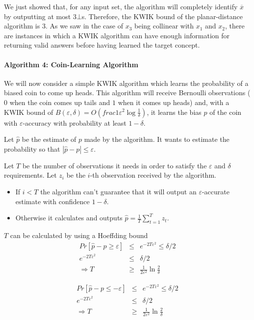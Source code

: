 We just showed that, for any input set, the algorithm will completely identify
$\overline{x}$ by outputting at most $3 \bot$s. Therefore, the KWIK bound of the
planar-distance algorithm is $3$. As we saw in the case of $x_3$ being collinear
with $x_1$ and $x_2$, there are instances in which a KWIK algorithm can
have enough information for returning valid answers before having learned the
target concept.

\paragraph{Algorithm 4: Coin-Learning Algorithm}
We will now consider a simple KWIK algorithm which learns the probability of a
biased coin to come up heads. This algorithm will receive Bernoulli observations
($0$ when the coin comes up tails and $1$ when it comes up heads) and, with a
KWIK bound of $B(\varepsilon, \delta) = O(frac{1}{\varepsilon^2}\log \frac{1}{\delta})$, it learns the
bias $p$ of the coin with $\varepsilon$-accuracy with probability at least $1-\delta$.

Let $\hat{p}$ be the estimate of $p$ made by the algorithm. It wants to estimate
the probability so that $|\hat{p} - p| \leq \varepsilon$.


Let $T$ be the number of observations it needs in order to satisfy the $\varepsilon$ and $\delta$ requirements.
Let $z_i$ be the $i$-th observation received by the algorithm.

\begin{itemize}
  \item If $i < T$ the algorithm can't guarantee that it will
  output an $\varepsilon$-accurate estimate with confidence $1-\delta$.
  \item Otherwise it calculates and outputs $\hat{p} = \frac{1}{T}\sum_{t=1}^{T}z_t$.
\end{itemize}
$T$ can be calculated by using a Hoeffding bound
\begin{eqnarray*}
  Pr[\hat{p} - p \geq \varepsilon] &\leq&  e^{-2T\varepsilon^2} \leq \delta/2 \\
  e^{-2T\varepsilon^2} &\leq& \delta/2 \\
  \Rightarrow T &\geq& \frac{1}{2\varepsilon^2}\ln \frac{2}{\delta}
\end{eqnarray*}

\begin{eqnarray*}
  Pr[\hat{p} - p \leq -\varepsilon] &\leq&  e^{-2T\varepsilon^2} \leq \delta/2 \\
  e^{-2T\varepsilon^2} &\leq& \delta/2 \\
  \Rightarrow T &\geq& \frac{1}{2\varepsilon^2}\ln \frac{2}{\delta}
\end{eqnarray*}

